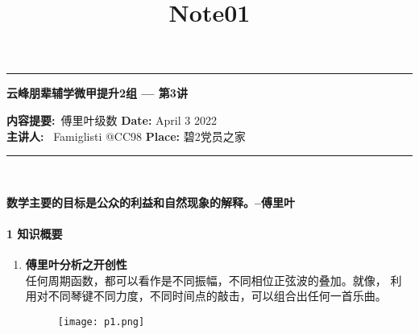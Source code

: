 \documentclass[12pt]{scrartcl}
\title{Note01}
\begin{document}
\begin{center}
	\hrule
	\vspace{.4cm}
	{\textbf { \large 云峰朋辈辅学微甲提升2组 --- 第3讲}}
\end{center}
{\textbf{内容提要:}\ 傅里叶级数 \hspace{\fill} \textbf{Date:} April 3 2022    \\
{ \textbf{主讲人:}} \ Famiglisti @CC98  \hspace{\fill} \textbf{Place:} 碧2党员之家 \\
	\hrule
~\\
\begin{center}
\textbf{\large{数学主要的目标是公众的利益和自然现象的解释。--傅里叶} }
\end{center}  
\paragraph*{\large 1 知识概要}
\begin{enumerate}
    \item  \textbf{傅里叶分析之开创性}\\
    \hspace*{0.7cm}任何周期函数，都可以看作是不同振幅，不同相位正弦波的叠加。就像，
    利用对不同琴键不同力度，不同时间点的敲击，可以组合出任何一首乐曲。
    \begin{figure}[htbp]
        \centering
        \texttt{[image: p1.png]}
        \end{figure}
    

\end{enumerate}}
\end{document}
